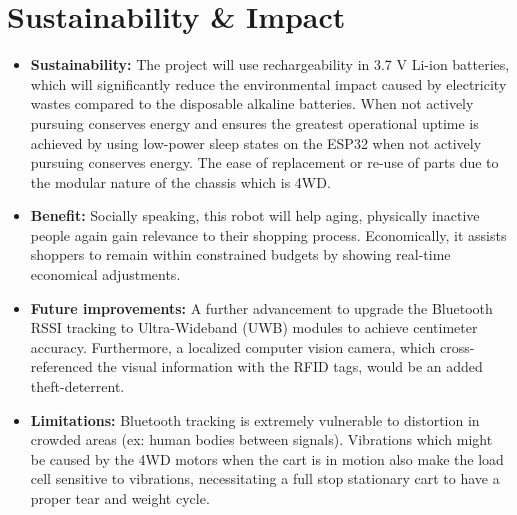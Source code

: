 \documentclass[12pt,a4paper]{article}
\begin{document}
\section{Sustainability \& Impact}
\begin{itemize}
    \item \textbf{Sustainability:} The project will use rechargeability in 3.7 V Li-ion batteries, which will significantly reduce the environmental impact caused by electricity wastes compared to the disposable alkaline batteries. When not actively pursuing conserves energy and ensures the greatest operational uptime is achieved by using low-power sleep states on the ESP32 when not actively pursuing conserves energy. The ease of replacement or re-use of parts due to the modular nature of the chassis which is 4WD.
    
    \item \textbf{Benefit:} Socially speaking, this robot will help aging, physically inactive people again gain relevance to their shopping process. Economically, it assists shoppers to remain within constrained budgets by showing real-time economical adjustments.
    
    \item \textbf{Future improvements:} A further advancement to upgrade the Bluetooth RSSI tracking to Ultra-Wideband (UWB) modules to achieve centimeter accuracy. Furthermore, a localized computer vision camera, which cross-referenced the visual information with the RFID tags, would be an added theft-deterrent.

    \item \textbf{Limitations:} Bluetooth tracking is extremely vulnerable to distortion in crowded areas (ex: human bodies between signals). Vibrations which might be caused by the 4WD motors when the cart is in motion also make the load cell sensitive to vibrations, necessitating a full stop stationary cart to have a proper tear and weight cycle. 

\end{itemize}
\end{document}
